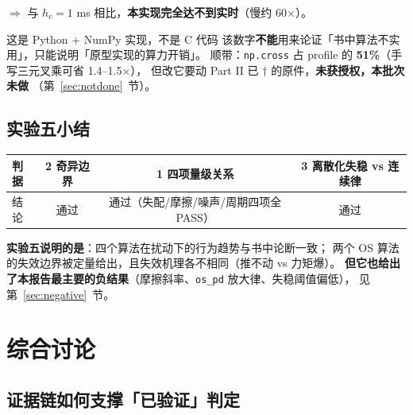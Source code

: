 \documentclass[11pt,a4paper]{ctexart}
\begin{document}
$\Rightarrow$ 与 $h_c=1$ ms 相比，\textbf{本实现完全达不到实时}（慢约 60$\times$）。

\begin{warnbox}{这是 Python + NumPy 实现，不是 C 代码}
该数字\textbf{不能}用来论证「书中算法不实用」，只能说明「原型实现的算力开销」。
顺带：\texttt{np.cross} 占 profile 的 \textbf{51\%}（手写三元叉乘可省 1.4--1.5$\times$），
但改它要动 Part II 已 $\dag$ 的原件，\textbf{未获授权，本批次未做}
（第~\ref{sec:notdone}~节）。
\end{warnbox}

\subsection{实验五小结}

\begin{table}[H]
\centering
\small
\begin{tabular}{@{}lccc@{}}
\toprule
判据 & 2 奇异边界 & 1 四项量级关系 & 3 离散化失稳 vs 连续律 \\
\midrule
结论 & 通过 & 通过（失配/摩擦/噪声/周期四项全 PASS） & 通过 \\
\bottomrule
\end{tabular}
\end{table}

\textbf{实验五说明的是}：四个算法在扰动下的行为趋势与书中论断一致；
两个 OS 算法的失效边界被定量给出，且失效机理各不相同（推不动 vs 力矩爆）。
\textbf{但它也给出了本报告最主要的负结果}（摩擦斜率、\texttt{os\_pd} 放大律、失稳阈值偏低），
见第~\ref{sec:negative}~节。

\section{综合讨论}\label{sec:discuss}

\subsection{证据链如何支撑「已验证」判定}
\end{document}
